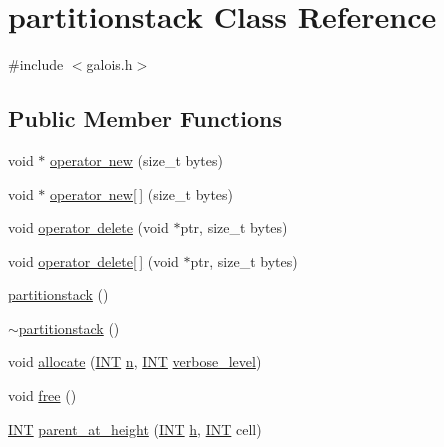 \hypertarget{classpartitionstack}{}\section{partitionstack Class Reference}
\label{classpartitionstack}


{\ttfamily \#include $<$galois.\+h$>$}

\subsection*{Public Member Functions}
\begin{DoxyCompactItemize}
\item 
void $\ast$ \mbox{\hyperlink{classpartitionstack_abb167d14c982f5f5a9a3d2011465b6de}{operator new}} (size\+\_\+t bytes)
\item 
void $\ast$ \mbox{\hyperlink{classpartitionstack_a5374438377fe175c370f1e7fc5fb2e5b}{operator new\mbox{[}$\,$\mbox{]}}} (size\+\_\+t bytes)
\item 
void \mbox{\hyperlink{classpartitionstack_a18cdc060426cd39c320fccc084427d15}{operator delete}} (void $\ast$ptr, size\+\_\+t bytes)
\item 
void \mbox{\hyperlink{classpartitionstack_aee36e3ca53ed87b2a4e0e4834c53b697}{operator delete\mbox{[}$\,$\mbox{]}}} (void $\ast$ptr, size\+\_\+t bytes)
\item 
\mbox{\hyperlink{classpartitionstack_ada34be40ca89f2091a241ba7e285eb45}{partitionstack}} ()
\item 
\mbox{\hyperlink{classpartitionstack_a17f37057f47c5a17b1f42fac4851bd4c}{$\sim$partitionstack}} ()
\item 
void \mbox{\hyperlink{classpartitionstack_a8ff49c4bd001383eb1f9f0d9bbb01c05}{allocate}} (\mbox{\hyperlink{galois_8h_a09fddde158a3a20bd2dcadb609de11dc}{I\+NT}} \mbox{\hyperlink{classpartitionstack_a46993cfd38e5ad600ada089bc261cd24}{n}}, \mbox{\hyperlink{galois_8h_a09fddde158a3a20bd2dcadb609de11dc}{I\+NT}} \mbox{\hyperlink{simeon_8_c_a818073fbcc2f439e7c56952f67386122}{verbose\+\_\+level}})
\item 
void \mbox{\hyperlink{classpartitionstack_a2700537302e50c65b9db6bbd4fd45f37}{free}} ()
\item 
\mbox{\hyperlink{galois_8h_a09fddde158a3a20bd2dcadb609de11dc}{I\+NT}} \mbox{\hyperlink{classpartitionstack_a56f2d05a29ef6612d67126163e368ffa}{parent\+\_\+at\+\_\+height}} (\mbox{\hyperlink{galois_8h_a09fddde158a3a20bd2dcadb609de11dc}{I\+NT}} \mbox{\hyperlink{alphabet2_8_c_a16611451551e3d15916bae723c3f59f7}{h}}, \mbox{\hyperlink{galois_8h_a09fddde158a3a20bd2dcadb609de11dc}{I\+NT}} cell)

\end{DoxyCompactItemize}
